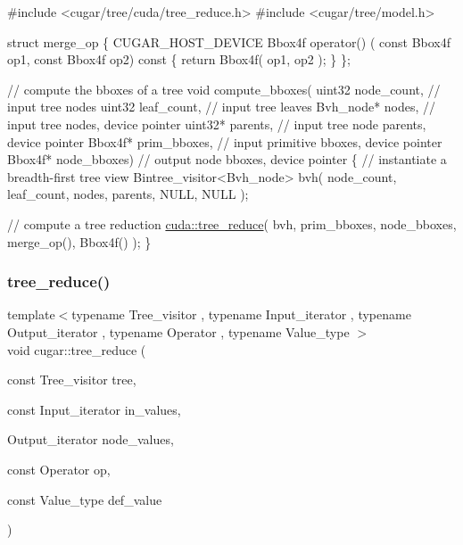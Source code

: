 \begin{DoxyCode}
\textcolor{preprocessor}{#include <cugar/tree/cuda/tree\_reduce.h>}
\textcolor{preprocessor}{#include <cugar/tree/model.h>}

\textcolor{keyword}{struct }merge\_op
\{
    CUGAR\_HOST\_DEVICE Bbox4f operator() (
        \textcolor{keyword}{const} Bbox4f op1,
        \textcolor{keyword}{const} Bbox4f op2)\textcolor{keyword}{ const }\{ \textcolor{keywordflow}{return} Bbox4f( op1, op2 ); \}
\};

\textcolor{comment}{// compute the bboxes of a tree}
\textcolor{keywordtype}{void} compute\_bboxes(
    uint32      node\_count,     \textcolor{comment}{// input tree nodes}
    uint32      leaf\_count,     \textcolor{comment}{// input tree leaves}
    Bvh\_node*   nodes,          \textcolor{comment}{// input tree nodes, device pointer}
    uint32*     parents,        \textcolor{comment}{// input tree node parents, device pointer}
    Bbox4f*     prim\_bboxes,    \textcolor{comment}{// input primitive bboxes, device pointer}
    Bbox4f*     node\_bboxes)    \textcolor{comment}{// output node bboxes, device pointer}
\{
    \textcolor{comment}{// instantiate a breadth-first tree view}
    Bintree\_visitor<Bvh\_node> bvh(
        node\_count,
        leaf\_count,
        nodes,
        parents,
        NULL,
        NULL );

    \textcolor{comment}{// compute a tree reduction}
    \hyperlink{group___trees_module_ga8044d04a72e3a0a2bf628bbfc237f954}{cuda::tree\_reduce}(
        bvh,
        prim\_bboxes,
        node\_bboxes,
        merge\_op(),
        Bbox4f() );
\}
\end{DoxyCode}
 \mbox{\label{group___trees_module_gaf7e2c5b8c843cd382db2d1b23c981694}} 
\subsubsection{\texorpdfstring{tree\+\_\+reduce()}{tree\_reduce()}\hspace{0.1cm}{\footnotesize\ttfamily [2/4]}}
{\footnotesize\ttfamily template$<$typename Tree\+\_\+visitor , typename Input\+\_\+iterator , typename Output\+\_\+iterator , typename Operator , typename Value\+\_\+type $>$ \\
void cugar\+::tree\+\_\+reduce (\begin{DoxyParamCaption}\item[{const Tree\+\_\+visitor}]{tree,  }\item[{const Input\+\_\+iterator}]{in\+\_\+values,  }\item[{Output\+\_\+iterator}]{node\+\_\+values,  }\item[{const Operator}]{op,  }\item[{const Value\+\_\+type}]{def\+\_\+value }\end{DoxyParamCaption})}

